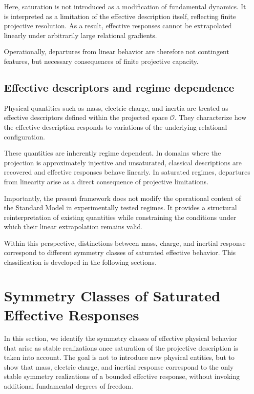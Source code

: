\documentclass[pdflatex,sn-mathphys-num]{sn-jnl} %
\theoremstyle{remark}
\begin{document}
      Here, saturation is not introduced as a modification of fundamental dynamics.
      It is interpreted as a limitation of the effective description itself,
      reflecting finite projective resolution.
      As a result, effective responses cannot be extrapolated linearly under
      arbitrarily large relational gradients.

      Operationally, departures from linear behavior are therefore not contingent
      features, but necessary consequences of finite projective capacity.

    \subsection{Effective descriptors and regime dependence}
      \label{subsec:effective-descriptors}

      Physical quantities such as mass, electric charge, and inertia are treated as
      effective descriptors defined within the projected space $\mathcal{O}$.
      They characterize how the effective description responds to variations of the
      underlying relational configuration.

      These quantities are inherently regime dependent.
      In domains where the projection is approximately injective and unsaturated,
      classical descriptions are recovered and effective responses behave linearly.
      In saturated regimes, departures from linearity arise as a direct consequence
      of projective limitations.

      Importantly, the present framework does not modify the operational content of
      the Standard Model in experimentally tested regimes.
      It provides a structural reinterpretation of existing quantities while
      constraining the conditions under which their linear extrapolation remains
      valid.

      Within this perspective, distinctions between mass, charge, and inertial
      response correspond to different symmetry classes of saturated effective
      behavior.
      This classification is developed in the following sections.

  \section{Symmetry Classes of Saturated Effective Responses}
    \label{sec:saturation}

    In this section, we identify the symmetry classes of effective physical behavior
    that arise as stable realizations once saturation of the projective description
    is taken into account.
    The goal is not to introduce new physical entities, but to show that mass,
    electric charge, and inertial response correspond to the only stable symmetry
    realizations of a bounded effective response, without invoking additional
    fundamental degrees of freedom.
\end{document}
